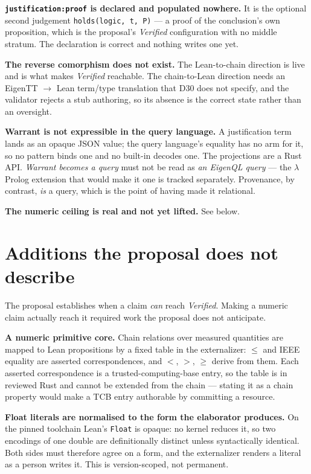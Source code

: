 \documentclass[manuscript,nonacm=true]{acmart}
\newcommand{\code}[1]{\texttt{\small #1}}
\newcommand{\cl}[1]{\textbf{#1}}
\begin{document}
\cl{\code{justification:proof} is declared and populated nowhere.} It is the optional second judgement \code{holds(logic, t, P)} --- a proof of the conclusion's own proposition, which is the proposal's \emph{Verified} configuration with no middle stratum. The declaration is correct and nothing writes one yet.

\cl{The reverse comorphism does not exist.} The Lean-to-chain direction is live and is what makes \emph{Verified} reachable. The chain-to-Lean direction needs an EigenTT $\to$ Lean term/type translation that D30 does not specify, and the validator rejects a stub authoring, so its absence is the correct state rather than an oversight.

\cl{Warrant is not expressible in the query language.} A justification term lands as an opaque JSON value; the query language's equality has no arm for it, so no pattern binds one and no built-in decodes one. The projections are a Rust API. \emph{Warrant becomes a query} must not be read as \emph{an EigenQL query} --- the \(\lambda\)Prolog extension that would make it one is tracked separately. Provenance, by contrast, \emph{is} a query, which is the point of having made it relational.

\cl{The numeric ceiling is real and not yet lifted.} See below.

\section{Additions the proposal does not describe}

The proposal establishes when a claim \emph{can} reach \emph{Verified}. Making a numeric claim actually reach it required work the proposal does not anticipate.

\cl{A numeric primitive core.} Chain relations over measured quantities are mapped to Lean propositions by a fixed table in the externalizer: $\le$ and IEEE equality are asserted correspondences, and $<$, $>$, $\ge$ derive from them. Each asserted correspondence is a trusted-computing-base entry, so the table is in reviewed Rust and cannot be extended from the chain --- stating it as a chain property would make a TCB entry authorable by committing a resource.

\cl{Float literals are normalised to the form the elaborator produces.} On the pinned toolchain Lean's \code{Float} is opaque: no kernel reduces it, so two encodings of one double are definitionally distinct unless syntactically identical. Both sides must therefore agree on a form, and the externalizer renders a literal as a person writes it. This is version-scoped, not permanent.
\end{document}
